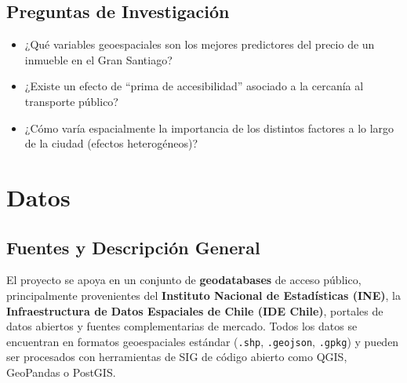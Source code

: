 \documentclass[12pt, letterpaper]{article}
\begin{document}
\subsection{Preguntas de Investigación}

\begin{itemize}[leftmargin=1.5em, itemsep=0.3em]
  \item ¿Qué variables geoespaciales son los mejores predictores del precio de
        un inmueble en el Gran Santiago?
  \item ¿Existe un efecto de ``prima de accesibilidad'' asociado a la cercanía
        al transporte público?
  \item ¿Cómo varía espacialmente la importancia de los distintos factores a lo
        largo de la ciudad (efectos heterogéneos)?
\end{itemize}

\section{Datos}

\subsection{Fuentes y Descripción General}

El proyecto se apoya en un conjunto de \textbf{geodatabases} de acceso público,
principalmente provenientes del \textbf{Instituto Nacional de Estadísticas (INE)},
la \textbf{Infraestructura de Datos Espaciales de Chile (IDE Chile)}, portales
de datos abiertos y fuentes complementarias de mercado. Todos los datos se
encuentran en formatos geoespaciales estándar (\texttt{.shp}, \texttt{.geojson},
\texttt{.gpkg}) y pueden ser procesados con herramientas de SIG de código abierto
como QGIS, GeoPandas o PostGIS.
\end{document}
